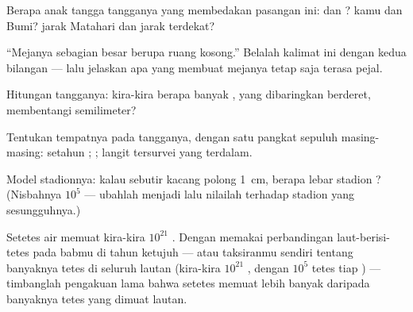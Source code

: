 \begin{exercise}[$\star$]\label{exo:g9:atoms-to-galaxies:5}
Berapa anak tangga tangganya yang membedakan pasangan ini:  dan
? kamu dan Bumi? jarak Matahari dan jarak  terdekat?
\end{exercise}

\begin{exercise}[$\star$]\label{exo:g9:atoms-to-galaxies:6}
``Mejanya sebagian besar berupa ruang kosong.'' Belalah kalimat ini
dengan kedua bilangan  --- lalu jelaskan apa yang membuat
mejanya tetap saja terasa pejal.
\end{exercise}

\begin{exercise}[$\star$]\label{exo:g9:atoms-to-galaxies:7}
Hitungan tangganya: kira-kira berapa banyak , yang dibaringkan
berderet, membentangi semilimeter?
\end{exercise}

\begin{exercise}[$\star$]\label{exo:g9:atoms-to-galaxies:8}
Tentukan tempatnya pada tangganya, dengan satu pangkat sepuluh
masing-masing: setahun ; ; langit tersurvei yang
terdalam.
\end{exercise}

\begin{exercise}[$\star\star$]\label{exo:g9:atoms-to-galaxies:9}
Model stadionnya: kalau  sebutir kacang polong \qty{1}{cm},
berapa lebar stadion ? (Nisbahnya $10^{5}$ --- ubahlah menjadi
 lalu nilailah terhadap stadion yang sesungguhnya.)
\end{exercise}

\begin{exercise}[$\star\star$]\label{exo:g9:atoms-to-galaxies:10}
Setetes air memuat kira-kira $10^{21}$ . Dengan memakai
perbandingan laut-berisi-tetes pada babmu di tahun ketujuh --- atau
taksiranmu sendiri tentang banyaknya tetes di seluruh lautan
(kira-kira $10^{21}$ , dengan $10^{5}$ tetes tiap ) ---
timbanglah pengakuan lama bahwa setetes memuat lebih banyak 
daripada banyaknya tetes yang dimuat lautan.
\end{exercise}


